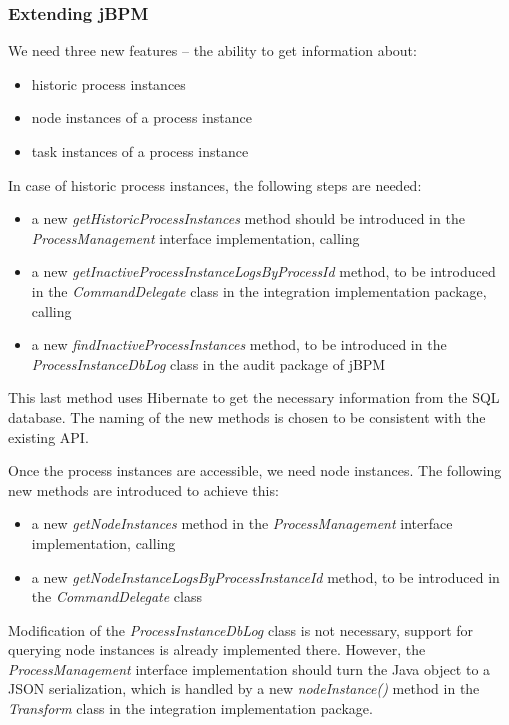 \subsubsection*{Extending jBPM}

We need three new features -- the ability to get information about:

\begin{itemize}
\item historic process instances
\item node instances of a process instance
\item task instances of a process instance
\end{itemize}

In case of historic process instances, the following steps are needed:

\begin{itemize}
\item a new \emph{getHistoricProcessInstances} method should be introduced in the \emph{ProcessManagement} interface implementation, calling
\item a new \emph{getInactiveProcessInstanceLogsByProcessId} method, to be introduced in the \emph{CommandDelegate} class in the integration implementation package, calling
\item a new \emph{findInactiveProcessInstances} method, to be introduced in the \emph{ProcessInstanceDbLog} class in the audit package of jBPM
\end{itemize}

This last method uses Hibernate to get the necessary information from the SQL
database. The naming of the new methods is chosen to be consistent with the
existing API.

Once the process instances are accessible, we need node instances. The
following new methods are introduced to achieve this:

\begin{itemize}
\item a new \emph{getNodeInstances} method in the \emph{ProcessManagement} interface implementation, calling
\item a new \emph{getNodeInstanceLogsByProcessInstanceId} method, to be introduced in the \emph{CommandDelegate} class
\end{itemize}

Modification of the \emph{ProcessInstanceDbLog} class is not necessary, support
for querying node instances is already implemented there. However, the
\emph{ProcessManagement} interface implementation should turn the Java object
to a JSON serialization, which is handled by a new \emph{nodeInstance()} method
in the \emph{Transform} class in the integration implementation package.


